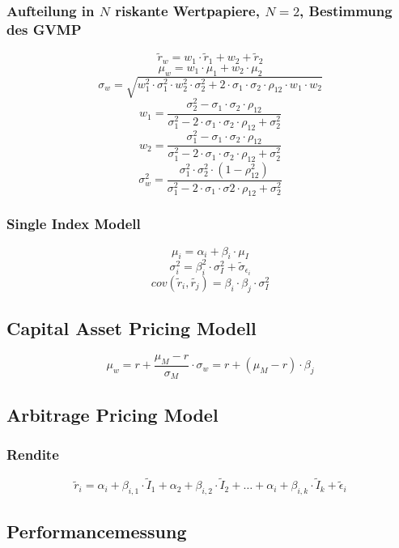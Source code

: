 \subsubsection{Aufteilung in \(N\) riskante Wertpapiere, \(N = 2\), Bestimmung des GVMP}
\[\tilde{r}_w = w_1 \cdot \tilde{r}_1 + w_2 + \tilde{r}_2\]
\[\mu_w = w_1 \cdot \mu_1 + w_2 \cdot \mu_2\]
\[\sigma_w = \sqrt{w_1^2 \cdot \sigma_1^2 \cdot w_2^2 \cdot \sigma_2^2 + 2 \cdot \sigma_1 \cdot \sigma_2 \cdot \rho_{12} \cdot w_1 \cdot w_2}\]
\[w_1 = \frac{\sigma_2^2-\sigma_1 \cdot \sigma_2 \cdot \rho_{12}}{\sigma_1^2-2 \cdot \sigma_1 \cdot \sigma_2 \cdot \rho_{12} + \sigma_2^2}\]
\[w_2 = \frac{\sigma_1^2 - \sigma_1 \cdot \sigma_2 \cdot \rho_{12}}{\sigma_1^2 - 2 \cdot \sigma_1 \cdot \sigma_2 \cdot \rho_{12} + \sigma_2^2}\]
\[\sigma_w^2 = \frac{\sigma_1^2 \cdot \sigma_2^2 \cdot (1 - \rho_{12}^2)}{\sigma_1^2 - 2 \cdot \sigma_1 \cdot \sigma2 \cdot \rho_{12} + \sigma_2^2}\]

\subsubsection{Single Index Modell}
\[\mu_i = \alpha_i + \beta_i \cdot \mu_I\]
\[\sigma_i^2 = \beta_i^2 \cdot \sigma_I^2 + \tilde{\sigma}_{\epsilon_i}\]
\[cov(\tilde{r}_i, \tilde{r_j}) = \beta_i \cdot \beta_j \cdot \sigma_I^2\]


\subsection{Capital Asset Pricing Modell}
\[\mu_w = r + \frac{\mu_M - r}{\sigma_M} \cdot \sigma_w = r + (\mu_M - r) \cdot \beta_j\]


\subsection{Arbitrage Pricing Model}

\subsubsection{Rendite}
\[\tilde{r}_i = \alpha_i + \beta_{i,1} \cdot \tilde{I}_1 + \alpha_2 + \beta_{i,2} \cdot \tilde{I}_2 + \dots + \alpha_i + \beta_{i,k} \cdot \tilde{I}_k + \tilde{\epsilon}_i\]


\subsection{Performancemessung}

